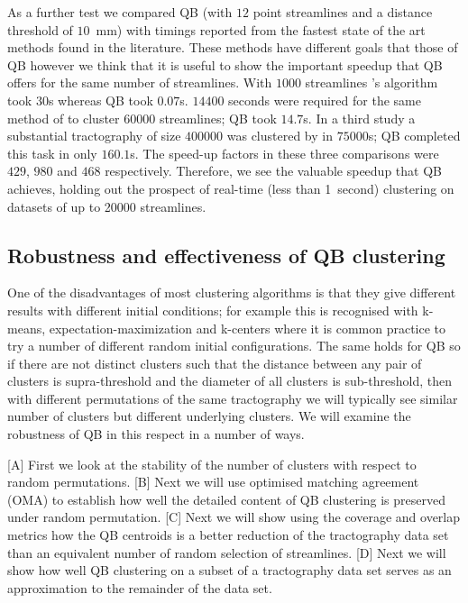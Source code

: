 \documentclass{bioinfo}
\begin{document}
As a further test we compared QB (with $12$ point streamlines and a
distance threshold of $10$~mm) with timings reported from the fastest
state of the art methods found in the literature. These methods have
different goals that those of QB however we think that it is useful to
show the important speedup that QB offers for the same number of
streamlines. With $\num{1000}$ streamlines
\citet{wang2010tractography}'s algorithm took $30$s whereas QB took
$0.07$s.  $\num{14400}$ seconds were required for the same method of to
cluster $\num{60000}$ streamlines; QB took $14.7$s.  In a third study a
substantial tractography of size $\num{400000}$ was clustered by
\citet{Visser2010} in $\num{75000}$s; QB completed this task in only
$160.1$s. The speed-up factors in these three comparisons were $429$,
$980$ and $468$ respectively. Therefore, we see the valuable speedup
that QB achieves, holding out the prospect of real-time (less than
1~second) clustering on datasets of up to \num{20000} streamlines.

\subsection{Robustness and effectiveness of QB  clustering\label{sub:Comparisons}}


One of the disadvantages of most clustering algorithms is that they give
different results with different initial conditions; for example this is
recognised with k-means, expectation-maximization
\citep{dempster1977maximum} and k-centers \citep{gonzalez1985clustering}
where it is common practice to try a number of different random initial
configurations. The same holds for QB so if there are not distinct
clusters such that the distance between any pair of clusters is
supra-threshold and the diameter of all clusters is sub-threshold, then
with different permutations of the same tractography we will typically
see similar number of clusters but different underlying clusters. We
will examine the robustness of QB in this respect in a number of ways.

[A] First we look at the stability of the number of clusters with
respect to random permutations. [B] Next we will use optimised matching
agreement (OMA) to establish how well the detailed content of QB
clustering is preserved under random permutation. [C] Next we will show
using the coverage and overlap metrics how the QB centroids is a better
reduction of the tractography data set than an equivalent number of
random selection of streamlines. [D] Next we will show how well QB
clustering on a subset of a tractography data set serves as an
approximation to the remainder of the data set.
\end{document}
